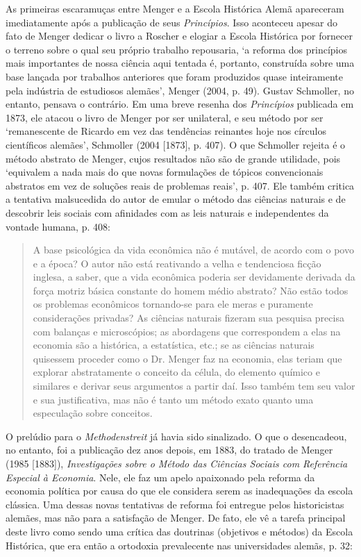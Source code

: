 \documentclass[12pt]{article}
\begin{document}
As primeiras escaramuças entre Menger e a Escola Histórica Alemã apareceram imediatamente após a publicação de seus \textit{Princípios}. Isso aconteceu apesar do fato de Menger dedicar o livro a Roscher e elogiar a Escola Histórica por fornecer o terreno sobre o qual seu próprio trabalho repousaria, ‘a reforma dos princípios mais importantes de nossa ciência aqui tentada é, portanto, construída sobre uma base lançada por trabalhos anteriores que foram produzidos quase inteiramente pela indústria de estudiosos alemães’, Menger (2004, p. 49). Gustav Schmoller, no entanto, pensava o contrário. Em uma breve resenha dos \textit{Princípios} publicada em 1873, ele atacou o livro de Menger por ser unilateral, e seu método por ser ‘remanescente de Ricardo em vez das tendências reinantes hoje nos círculos científicos alemães’, Schmoller (2004 [1873], p. 407). O que Schmoller rejeita é o método abstrato de Menger, cujos resultados não são de grande utilidade, pois ‘equivalem a nada mais do que novas formulações de tópicos convencionais abstratos em vez de soluções reais de problemas reais’, p. 407. Ele também critica a tentativa malsucedida do autor de emular o método das ciências naturais e de descobrir leis sociais com afinidades com as leis naturais e independentes da vontade humana, p. 408:

\begin{quote}
A base psicológica da vida econômica não é mutável, de acordo com o povo e a época? O autor não está reativando a velha e tendenciosa ficção inglesa, a saber, que a vida econômica poderia ser devidamente derivada da força motriz básica constante do homem médio abstrato? Não estão todos os problemas econômicos tornando-se para ele meras e puramente considerações privadas? As ciências naturais fizeram sua pesquisa precisa com balanças e microscópios; as abordagens que correspondem a elas na economia são a histórica, a estatística, etc.; se as ciências naturais quisessem proceder como o Dr. Menger faz na economia, elas teriam que explorar abstratamente o conceito da célula, do elemento químico e similares e derivar seus argumentos a partir daí. Isso também tem seu valor e sua justificativa, mas não é tanto um método exato quanto uma especulação sobre conceitos.
\end{quote}

O prelúdio para o \textit{Methodenstreit} já havia sido sinalizado. O que o desencadeou, no entanto, foi a publicação dez anos depois, em 1883, do tratado de Menger (1985 [1883]), \textit{Investigações sobre o Método das Ciências Sociais com Referência Especial à Economia}. Nele, ele faz um apelo apaixonado pela reforma da economia política por causa do que ele considera serem as inadequações da escola clássica. Uma dessas novas tentativas de reforma foi entregue pelos historicistas alemães, mas não para a satisfação de Menger. De fato, ele vê a tarefa principal deste livro como sendo uma crítica das doutrinas (objetivos e métodos) da Escola Histórica, que era então a ortodoxia prevalecente nas universidades alemãs, p. 32:
\end{document}
